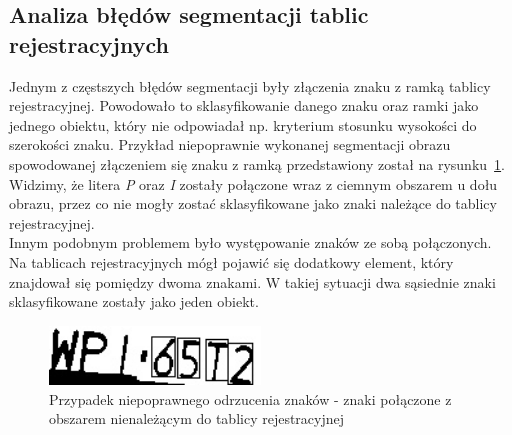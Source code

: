 \subsection{Analiza błędów segmentacji tablic rejestracyjnych}
Jednym z częstszych błędów segmentacji były złączenia znaku z ramką tablicy rejestracyjnej. Powodowało to sklasyfikowanie danego znaku oraz ramki jako jednego obiektu, który nie odpowiadał np. kryterium stosunku wysokości do szerokości znaku. Przykład niepoprawnie wykonanej segmentacji obrazu spowodowanej złączeniem się znaku z ramką przedstawiony został na rysunku~\ref{fig:polaczone_krawedzie}. Widzimy, że litera \textit{P} oraz \textit{I} zostały połączone wraz z ciemnym obszarem u dołu obrazu, przez co nie mogły zostać sklasyfikowane jako znaki należące do tablicy rejestracyjnej. \\
Innym podobnym problemem było występowanie znaków ze sobą połączonych. Na tablicach rejestracyjnych mógł pojawić się dodatkowy element, który znajdował się pomiędzy dwoma znakami. W takiej sytuacji dwa sąsiednie znaki sklasyfikowane zostały jako jeden obiekt. 
\begin{figure}
  \centering
  \includegraphics[width=0.5\textwidth]{img/polaczone-krawedzie}
  \caption{Przypadek niepoprawnego odrzucenia znaków - znaki połączone z obszarem nienależącym do tablicy rejestracyjnej}
  \label{fig:polaczone_krawedzie}
\end{figure}
